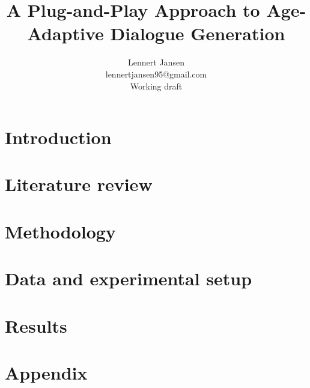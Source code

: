 \documentclass{article}
\title{A Plug-and-Play Approach to Age-Adaptive Dialogue Generation}
\author{%
  Lennert Jansen\\
  lennertjansen95@gmail.com \\
  Working draft
}
\begin{document}
 
\maketitle

\tableofcontents

% 

\newpage
\section{Introduction}


\section{Literature review}


\section{Methodology}



\section{Data and experimental setup}



% 

\section{Results}




\newpage



\newpage


\appendix
\section{Appendix}

\end{document}

